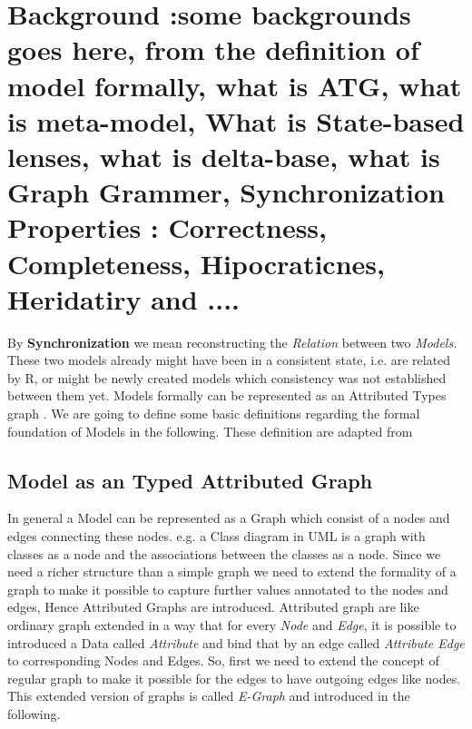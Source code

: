 \section{Background :some backgrounds goes here, from the definition of model
formally, what is ATG, what is meta-model, What is State-based lenses, what is delta-base, 
what is Graph Grammer, Synchronization Properties : Correctness, Completeness, Hipocraticnes, Heridatiry and .... }

By \textbf {Synchronization}  we mean reconstructing the {\em Relation} between two {\em Models.} These two models already might have been in a consistent state, i.e. are related by R, or might be newly created models which consistency was not established between them yet. Models formally can be represented as an Attributed Types graph \cite{Ehrig:2004:FundementalATG, book:Ehrig2010}.  We are going to define some basic definitions regarding the formal foundation of Models in the following. These definition are adapted from \cite{book:Ehrig2010, Ehrig:2004:ATGFundemental}

\subsection{Model as an Typed Attributed Graph}
In general a Model can be represented as a Graph which consist of a nodes and edges connecting these nodes. e.g. a Class diagram in UML is a graph with classes as a node and the associations between the classes as a node. Since we need a richer structure than a simple graph we need to extend the formality of a graph to make it possible to capture further values annotated to the nodes and edges, Hence Attributed Graphs are introduced. Attributed graph are like ordinary graph extended in a way that for every {\em Node} and {\em Edge}, it is possible to introduced a Data called  {\em Attribute} and bind that by an edge called {\em Attribute Edge} to corresponding Nodes and Edges. So, first we need to extend the concept of regular graph to make it possible for the edges to have outgoing edges like nodes. This extended version of graphs is called {\em E-Graph} and introduced in the following.



